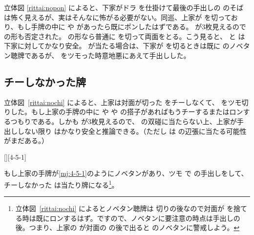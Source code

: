 \documentclass[10pt, twocolumn]{article}
\newlength\stdbls %
\newcommand{\mjfn}[1]{\raisebox{-.135\stdbls}{\mahjong[0.75\stdbls]{#1}}}
\begin{document}
立体図 \ref{rittai:nopon} によると、下家がドラ  を仕掛けて最後の手出しの  のそばは怖く見えるが、実はそんなに怖がる必要がない。同巡、上家が  を切っており、もし手牌の中に  や  があったら既にポンしたはずである。 が3枚見えるので  の形も否定された。 の形なら普通に  を切って両面をとる。こう見ると、 と  は下家に対してかなり安全。 が当たる場合は、下家が  を切るときは既に  のノベタン聴牌であるが、 をツモった時意地悪にあえて手出しした。

\subsection{チーしなかった牌}

\begin{rittai}[h]
  \centering
  
  
  \caption{6巡目に上家がドラ  をポンして打  \citep[][p.~72]{takizawa-yomi}}
  \label{rittai:nochi}
\end{rittai}

立体図~\ref{rittai:nochi} によると、上家は対面が切った  をチーしなくて、 をツモ切りした。もし上家の手牌の中に  や  や  の搭子があればもうチーするまたはロンするつもりである。しかも  が3枚見えるので、 の双碰に当たらない上、上家が手出ししない限り  はかなり安全と推論できる。（ただし  は の辺張に当たる可能性がまだある。）

[][4-5-1]

もし上家の手牌が\ref{mj:4-5-1}のようにノベタンがあり、ツモ  で  の手出しをして、チーしなかった  は当たり牌になる\footnote{立体図~\ref{rittai:nochi} によるとノベタン聴牌は \mjfn{2s} 切りの後なので対面が \mjfn{4p} を捨てる時は既にロンするはず。ですので、ノベタンに要注意の時点は手出しの後。つまり、上家の \mjfn{2s} が対面の \mjfn{4p} の後で出ると \mjfn{1234p} のノベタンに警戒しよう。}。
\end{document}
